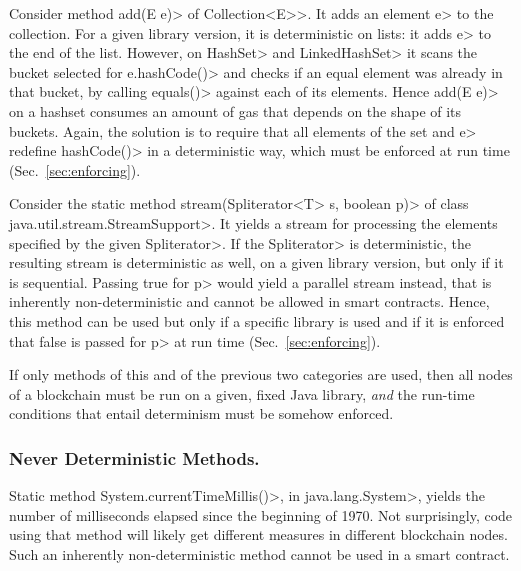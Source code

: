 Consider method \<add(E e)> of \<Collection$\text{<}$E$\text{>}$>.
It adds an element \<e> to the collection. For a given library version,
it is deterministic on lists: it adds \<e> to the end of the list.
However, on \<HashSet> and \<LinkedHashSet> it scans the bucket selected
for \<e.hashCode()> and checks if an equal element was already in that
bucket, by calling \<equals()> against each of its elements. Hence \<add(E e)>
on a hashset consumes an amount of gas that depends on the shape of its buckets.
Again, the solution is to require that all elements of the set and \<e> redefine
\<hashCode()> in a deterministic way, which must be enforced at run time
(Sec.~\ref{sec:enforcing}).

Consider the static method
\<stream(Spliterator$\text{<}$T$\text{>}$ s, boolean p)>
of class \<java.util.stream.StreamSupport>. It
yields a stream for processing the elements specified by
the given \<Spliterator>. If the \<Spliterator> is deterministic,
the resulting stream is deterministic as well,
on a given library version, but only if it is sequential.
Passing true for \<p> would yield a parallel stream instead, that is
inherently non-deterministic and cannot be allowed in smart contracts.
Hence, this method can be used but only if a specific library is used and
if it is enforced that false is passed for \<p> at run time (Sec.~\ref{sec:enforcing}).

If only methods of this and of the previous two categories are used, then
all nodes of a blockchain must be run on a given, fixed Java library, \emph{and}
the run-time conditions that entail determinism must be somehow enforced.

\subsubsection*{Never Deterministic Methods.}
Static method \<System.currentTimeMillis()>, in \<java.lang.System>,
yields the number of milliseconds elapsed since the beginning of 1970.
Not surprisingly, code using that method will likely get different measures in different
blockchain nodes.
Such an inherently non-deterministic method cannot be used in a smart contract.

